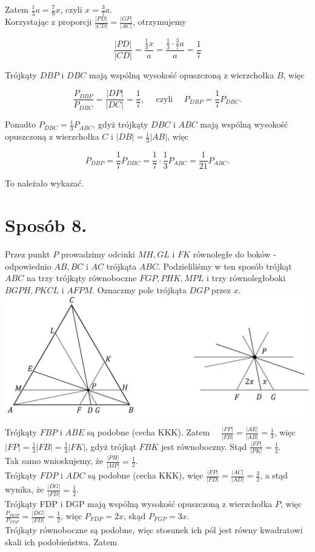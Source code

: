 \documentclass[10pt]{article}
\begin{document}
Zatem $\frac{1}{3} a=\frac{7}{9} x$, czyli $x=\frac{3}{7} a$.\\
Korzystając z proporcji $\frac{|P D|}{|C D|}=\frac{|G P|}{|A C|}$, otrzymujemy

$$
\frac{|P D|}{|C D|}=\frac{\frac{1}{3} x}{a}=\frac{\frac{1}{3} \cdot \frac{3}{7} a}{a}=\frac{1}{7}
$$

Trójkąty $D B P$ i $D B C$ mają wspólną wysokość opuszczoną z wierzchołka $B$, więc

$$
\frac{P_{D B P}}{P_{D B C}}=\frac{|D P|}{|D C|}=\frac{1}{7}, \quad \text { czyli } \quad P_{D B P}=\frac{1}{7} P_{D B C} .
$$

Ponadto $P_{D B C}=\frac{1}{3} P_{A B C}$, gdyż trójkąty $D B C$ i $A B C$ mają wspólną wysokość opuszczoną z wierzchołka $C$ i $|D B|=\frac{1}{3}|A B|$, więc

$$
P_{D B P}=\frac{1}{7} P_{D B C}=\frac{1}{7} \cdot \frac{1}{3} P_{A B C}=\frac{1}{21} P_{A B C} .
$$

To należało wykazać.

\section*{Sposób 8.}
Przez punkt $P$ prowadzimy odcinki $M H, G L$ i $F K$ równoległe do boków - odpowiednio $A B, B C$ i $A C$ trójkąta $A B C$. Podzieliliśmy w ten sposób trójkąt $A B C$ na trzy trójkąty równoboczne $F G P, P H K, M P L$ i trzy równoległoboki $B G P H, P K C L$ i $A F P M$. Oznaczmy pole trójkąta $D G P$ przez $x$.\\
\includegraphics[max width=\textwidth, center]{2025_02_07_36131546116d12814c9cg-18}

Trójkąty $F B P$ i $A B E$ są podobne (cecha KKK). Zatem $\quad \frac{|F P|}{|F B|}=\frac{|A E|}{|A B|}=\frac{1}{3}$, więc $|F P|=\frac{1}{3}|F B|=\frac{1}{3}|F K|$, gdyż trójkąt $F B K$ jest równoboczny. Stąd $\frac{|F P|}{|P K|}=\frac{1}{2}$.\\
Tak samo wnioskujemy, że $\frac{|P H|}{|M P|}=\frac{1}{2}$.\\
Trójkąty $F D P$ i $A D C$ są podobne (cecha KKK), więc $\frac{|F P|}{|F D|}=\frac{|A C|}{|A D|}=\frac{3}{2}$, a stąd wynika, że $\frac{|D G|}{|F D|}=\frac{1}{2}$.\\
Trójkąty FDP i DGP mają wspólną wysokość opuszczoną z wierzchołka $P$, więc $\frac{P_{D G P}}{P_{F D P}}=\frac{|D G|}{|F D|}=\frac{1}{2}$, więc $P_{F D P}=2 x$, skąd $P_{F G P}=3 x$.\\
Trójkąty równoboczne są podobne, więc stosunek ich pól jest równy kwadratowi skali ich podobieństwa. Zatem
\end{document}

